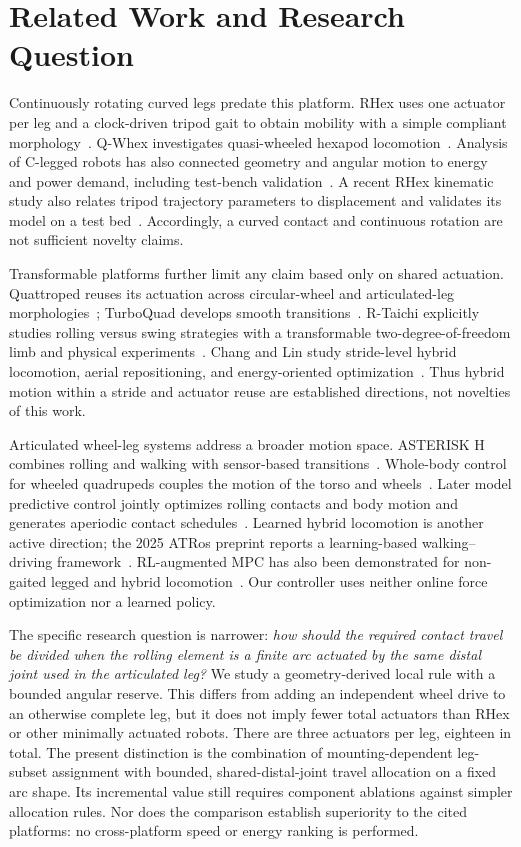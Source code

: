 \documentclass[letterpaper,10pt,conference]{ieeeconf}
\begin{document}
\section{Related Work and Research Question}
Continuously rotating curved legs predate this platform. RHex uses one actuator per leg and a clock-driven tripod gait to obtain mobility with a simple compliant morphology~\cite{saranli2001rhex}. Q-Whex investigates quasi-wheeled hexapod locomotion~\cite{zhang2023qwhex}. Analysis of C-legged robots has also connected geometry and angular motion to energy and power demand, including test-bench validation~\cite{vina2021cleg}. A recent RHex kinematic study also relates tripod trajectory parameters to displacement and validates its model on a test bed~\cite{burzynski2024kinematics}. Accordingly, a curved contact and continuous rotation are not sufficient novelty claims.

Transformable platforms further limit any claim based only on shared actuation. Quattroped reuses its actuation across circular-wheel and articulated-leg morphologies~\cite{chen2014quattroped}; TurboQuad develops smooth transitions~\cite{chen2017turboquad}. R-Taichi explicitly studies rolling versus swing strategies with a transformable two-degree-of-freedom limb and physical experiments~\cite{xue2025rolling}. Chang and Lin study stride-level hybrid locomotion, aerial repositioning, and energy-oriented optimization~\cite{chang2026stride}. Thus hybrid motion within a stride and actuator reuse are established directions, not novelties of this work.

Articulated wheel-leg systems address a broader motion space. ASTERISK H combines rolling and walking with sensor-based transitions~\cite{yoshioka2008asterisk}. Whole-body control for wheeled quadrupeds couples the motion of the torso and wheels~\cite{bjelonic2019keep}. Later model predictive control jointly optimizes rolling contacts and body motion and generates aperiodic contact schedules~\cite{bjelonic2021wholebody}. Learned hybrid locomotion is another active direction; the 2025 ATRos preprint reports a learning-based walking--driving framework~\cite{sun2025atros}. RL-augmented MPC has also been demonstrated for non-gaited legged and hybrid locomotion~\cite{patrizi2026augmpc}. Our controller uses neither online force optimization nor a learned policy.

The specific research question is narrower: \emph{how should the required contact travel be divided when the rolling element is a finite arc actuated by the same distal joint used in the articulated leg?} We study a geometry-derived local rule with a bounded angular reserve. This differs from adding an independent wheel drive to an otherwise complete leg, but it does not imply fewer total actuators than RHex or other minimally actuated robots. There are three actuators per leg, eighteen in total. The present distinction is the combination of mounting-dependent leg-subset assignment with bounded, shared-distal-joint travel allocation on a fixed arc shape. Its incremental value still requires component ablations against simpler allocation rules. Nor does the comparison establish superiority to the cited platforms: no cross-platform speed or energy ranking is performed.
\end{document}
